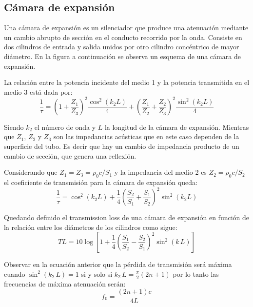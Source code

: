 \documentclass[a5paper,12pt,twoside]{book}
\begin{document}
\subsection{Cámara de expansión}

Una cámara de expansión es un silenciador que produce una atenuación mediante un cambio abrupto de sección en el conducto recorrido por la onda. Consiste en dos cilindros de entrada y salida unidos por otro cilindro concéntrico de mayor diámetro. En la figura a continuación se observa un esquema de una cámara de expansión.

\begin{center}
    \def\svgwidth{\linewidth}
    
\end{center}

La relación entre la potencia incidente del medio 1 y la potencia transmitida en el medio 3 está dada por:
\begin{equation*}
    \dfrac{1}{\tau} = \left( 1+\frac{Z_1}{Z_3} \right)^2 \frac{\cos^2 (k_2 L)}{4} + \left( \frac{Z_1}{Z_2}+\frac{Z_2}{Z_3} \right)^2 \frac{\sin^2 (k_2 L)}{4}
\end{equation*}

Siendo $k_2$ el número de onda y $L$ la longitud de la cámara de expansión. Mientras que $Z_1$, $Z_2$ y $Z_3$ son las impedancias acústicas que en este caso dependen de la superficie del tubo. Es decir que hay un cambio de impedancia producto de un cambio de sección, que genera una reflexión.

Considerando que $Z_1=Z_3=\rho_0 c/S_1$ y la impedancia del medio 2 es $Z_2=\rho_0 c/S_2$ el coeficiente de transmisión para la cámara de expansión queda:
\begin{equation*}
    \dfrac{1}{\tau} = \cos^2 (k_2 L)+ \frac{1}{4} \left( \dfrac{S_2}{S_1} + \frac{S_1}{S_2} \right)^2 \sin^2(k_2 L)
\end{equation*}

Quedando definido el transmission loss de una cámara de expansión en función de la relación entre los diámetros de los cilindros como sigue:
\begin{equation*}
    TL = 10 \log \left[ 1 + \frac{1}{4} \left( \frac{S_1}{S_2} - \frac{S_2}{S_1} \right)^2 \sin^2 (k \, L) \right]
\end{equation*}

Observar en la ecuación anterior que la pérdida de transmisión será máxima cuando $\sin^2(k_2 \, L)=1$ si y solo si $k_2 \, L = \tfrac{\pi}{2} \left( 2n+1 \right)$ por lo tanto las frecuencias de máxima atenuación serán:
\begin{equation*}
    f_0 = \frac{\left( 2n+1 \right) c}{4L}
\end{equation*}
\end{document}
